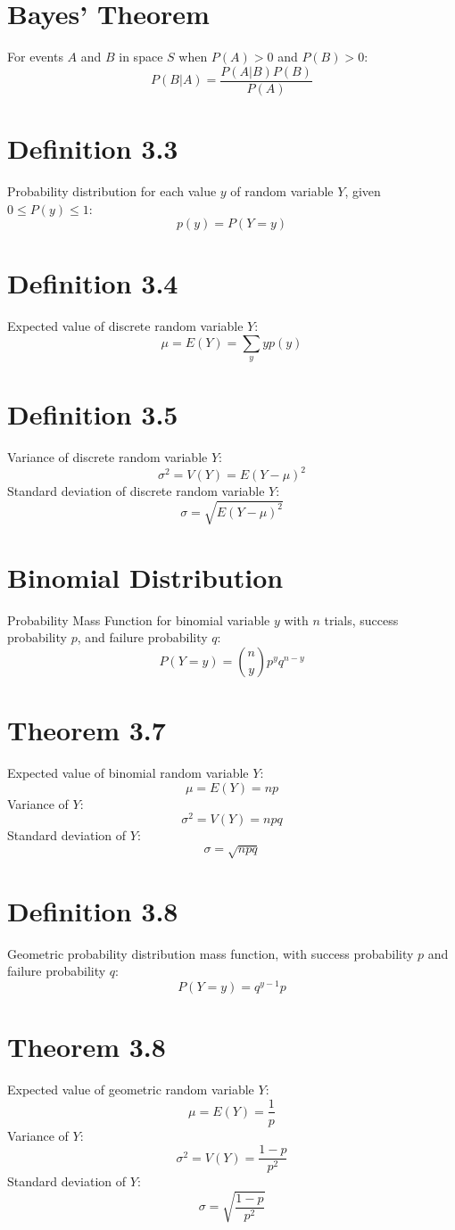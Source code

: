 \documentclass[12pt]{article}
\begin{document}
\section{Bayes' Theorem}
For events $A$ and $B$ in space $S$ when $P(A) > 0$ and $P(B) > 0$:
\[
P(B|A) = \frac{P(A|B)P(B)}{P(A)}
\]

\section{Definition 3.3}
Probability distribution for each value $y$ of random variable $Y$, given $0 \leq P(y) \leq 1$:
\[
p(y) = P(Y = y)
\]

\section{Definition 3.4}
Expected value of discrete random variable $Y$:
\[
\mu = E(Y) = \sum_{y} y p(y)
\]

\section{Definition 3.5}
Variance of discrete random variable $Y$:
\[
\sigma^2 = V(Y) = E(Y - \mu)^2
\]
Standard deviation of discrete random variable $Y$:
\[
\sigma = \sqrt{E(Y - \mu)^2}
\]

\section{Binomial Distribution}
Probability Mass Function for binomial variable $y$ with $n$ trials, success probability $p$, and failure probability $q$:
\[
P(Y = y) = \binom{n}{y} p^y q^{n-y}
\]

\section{Theorem 3.7}
Expected value of binomial random variable $Y$:
\[
\mu = E(Y) = np
\]
Variance of $Y$:
\[
\sigma^2 = V(Y) = npq
\]
Standard deviation of $Y$:
\[
\sigma = \sqrt{npq}
\]

\section{Definition 3.8}
Geometric probability distribution mass function, with success probability $p$ and failure probability $q$:
\[
P(Y = y) = q^{y-1}p
\]

\section{Theorem 3.8}
Expected value of geometric random variable $Y$:
\[
\mu = E(Y) = \frac{1}{p}
\]
Variance of $Y$:
\[
\sigma^2 = V(Y) = \frac{1-p}{p^2}
\]
Standard deviation of $Y$:
\[
\sigma = \sqrt{\frac{1-p}{p^2}}
\]
\end{document}
